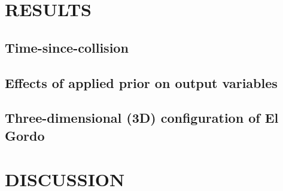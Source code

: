 \section{RESULTS} 



\subsection{Time-since-collision}  



\subsection{Effects of applied prior on output variables}




\subsection{Three-dimensional (3D) configuration of El Gordo}


\section{DISCUSSION}

